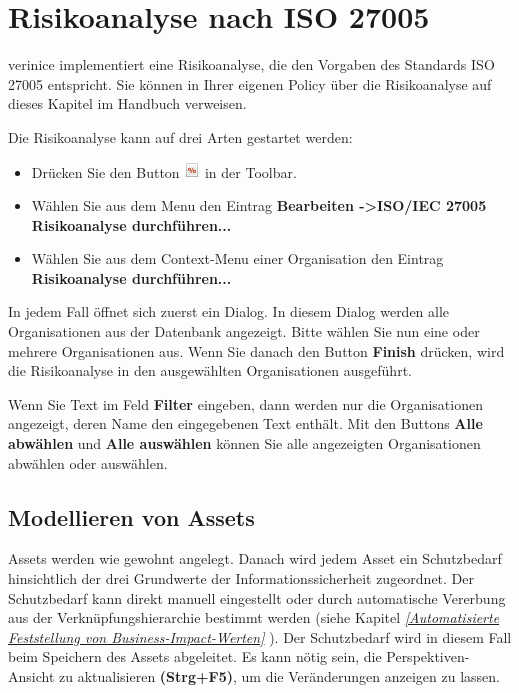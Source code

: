 \documentclass[a4paper,10pt]{book}
\begin{document}
\section{Risikoanalyse nach ISO 27005}
\label{sec:Risk Assessment ISO 27005}
verinice implementiert eine Risikoanalyse, die den Vorgaben des Standards ISO 27005 entspricht. Sie können in Ihrer eigenen Policy über die Risikoanalyse auf dieses Kapitel im Handbuch verweisen.


Die Risikoanalyse kann auf drei Arten gestartet werden:
\begin{itemize}
 \item Drücken Sie den Button \includegraphics[height=2ex]{Icon/16-paper-calculate-percent.png} in der Toolbar.
 \item Wählen Sie aus dem Menu den Eintrag \textbf {Bearbeiten -\textgreater ISO/IEC 27005 Risikoanalyse durchführen...}
 \item Wählen Sie aus dem Context-Menu einer Organisation den Eintrag \textbf {Risikoanalyse durchführen...}
\end{itemize}

In jedem Fall öffnet sich zuerst ein Dialog. In diesem Dialog werden alle Organisationen aus der Datenbank angezeigt. Bitte wählen Sie nun eine oder mehrere Organisationen aus.
Wenn Sie danach den Button \textbf {Finish} drücken, wird die Risikoanalyse in den ausgewählten Organisationen ausgeführt.

Wenn Sie Text im Feld \textbf {Filter} eingeben, dann werden nur die Organisationen angezeigt, deren Name den eingegebenen Text enthält. Mit den Buttons \textbf {Alle abwählen} und \textbf {Alle auswählen} können Sie alle angezeigten Organisationen abwählen oder auswählen.

\subsection{Modellieren von Assets}
Assets werden wie gewohnt angelegt. Danach wird jedem Asset ein Schutzbedarf hinsichtlich der drei Grundwerte der
Informationssicherheit zugeordnet. Der Schutzbedarf kann direkt manuell eingestellt oder durch automatische
Vererbung aus der Verknüpfungshierarchie bestimmt werden (siehe Kapitel {\em \ref{Automatisierte Feststellung von Business-Impact-Werten} }).
Der Schutzbedarf wird in diesem Fall beim Speichern des Assets abgeleitet. Es kann nötig sein, die Perspektiven-Ansicht zu aktualisieren \textbf{(Strg+F5)},
um die Veränderungen anzeigen zu lassen.
\end{document}
